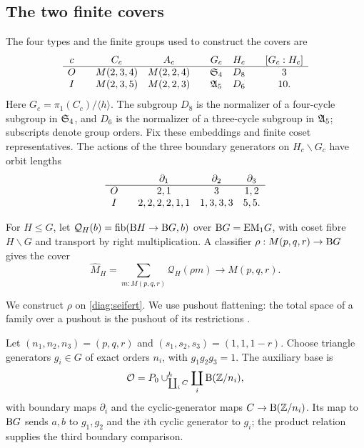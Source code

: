 \subsection{The two finite covers}

The four types and the finite groups used to construct the covers are
\[
\begin{array}{c@{\qquad}cc@{\qquad}cc@{\qquad}c}
 c&C_c&A_c&G_c&H_c&[G_c:H_c]\\ \hline
 O&M(2,3,4)&M(2,2,4)&\Sym_4&D_8&3\\
 I&M(2,3,5)&M(2,2,3)&\Alt_5&D_6&10.
\end{array}
\]
Here $G_c=\pi_1(C_c)/\langle h\rangle$. The subgroup $D_8$ is the normalizer of a four-cycle subgroup in $\mathfrak S_4$, and $D_6$ is the normalizer of a three-cycle subgroup in $\mathfrak A_5$; subscripts denote group orders. Fix these embeddings and finite coset representatives. The actions of the three boundary generators on $H_c\backslash G_c$ have orbit lengths
\begin{equation}\label{eq:orbit-lengths}
\begin{array}{c@{\qquad}ccc}
 &\partial_1&\partial_2&\partial_3\\ \hline
 O&2,1&3&1,2\\
 I&2,2,2,2,1,1&1,3,3,3&5,5.
\end{array}
\end{equation}

\begin{construction}\label{con:coset-cover}
For $H\leq G$, let $\mathcal Q_H(b)=\operatorname{fib}(\mathrm B H\to\mathrm B G,b)$ over $\mathrm B G=\mathrm{EM}_1G$, with coset fibre $H\backslash G$ and transport by right multiplication. A classifier $\rho:M(p,q,r)\to\mathrm B G$ gives the cover
\begin{equation}\label{eq:coset-total}
\widehat M_H=\sum_{m:M(p,q,r)}\mathcal Q_H(\rho m)\longrightarrow M(p,q,r).
\end{equation}
\end{construction}
We construct $\rho$ on \eqref{diag:seifert}. We use pushout flattening: the total space of a family over a pushout is the pushout of its restrictions \cite{hott,cubical}.

Let $(n_1,n_2,n_3)=(p,q,r)$ and $(s_1,s_2,s_3)=(1,1,1-r)$. Choose triangle generators $g_i\in G$ of exact orders $n_i$, with $g_1g_2g_3=1$. The auxiliary base is
\[
\mathcal O=P_0\mathbin{\cup}^{h}_{\coprod_i C}\coprod_i\mathrm B(\mathbb Z/n_i),
\]
with boundary maps $\partial_i$ and the cyclic-generator maps $C\to\mathrm B(\mathbb Z/n_i)$. Its map to $\mathrm B G$ sends $a,b$ to $g_1,g_2$ and the $i$th cyclic generator to $g_i$; the product relation supplies the third boundary comparison.

